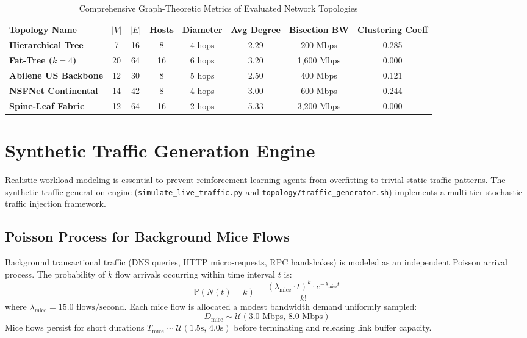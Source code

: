 \documentclass[12pt,a4paper,oneside]{report}
\begin{document}
\begin{table}[htbp]
\centering
\caption{Comprehensive Graph-Theoretic Metrics of Evaluated Network Topologies}
\label{tab:graph_metrics_comparative}
\small
\begin{tabularx}{\textwidth}{l c c c c c c c}
\toprule
\textbf{Topology Name} & \textbf{$|V|$} & \textbf{$|E|$} & \textbf{Hosts} & \textbf{Diameter} & \textbf{Avg Degree} & \textbf{Bisection BW} & \textbf{Clustering Coeff} \\
\midrule
\textbf{Hierarchical Tree} & 7 & 16 & 8 & 4 hops & 2.29 & 200 Mbps & 0.285 \\
\textbf{Fat-Tree ($k=4$)} & 20 & 64 & 16 & 6 hops & 3.20 & 1,600 Mbps & 0.000 \\
\textbf{Abilene US Backbone} & 12 & 30 & 8 & 5 hops & 2.50 & 400 Mbps & 0.121 \\
\textbf{NSFNet Continental} & 14 & 42 & 8 & 4 hops & 3.00 & 600 Mbps & 0.244 \\
\textbf{Spine-Leaf Fabric} & 12 & 64 & 16 & 2 hops & 5.33 & 3,200 Mbps & 0.000 \\
\bottomrule
\end{tabularx}
\end{table}

\section{Synthetic Traffic Generation Engine}
Realistic workload modeling is essential to prevent reinforcement learning agents from overfitting to trivial static traffic patterns. The synthetic traffic generation engine (\texttt{simulate\_live\_traffic.py} and \texttt{topology/traffic\_generator.sh}) implements a multi-tier stochastic traffic injection framework.

\subsection{Poisson Process for Background Mice Flows}
Background transactional traffic (DNS queries, HTTP micro-requests, RPC handshakes) is modeled as an independent Poisson arrival process. The probability of $k$ flow arrivals occurring within time interval $t$ is:
\begin{equation}
    \mathbb{P}(N(t) = k) = \frac{(\lambda_{\text{mice}} \cdot t)^k \cdot e^{-\lambda_{\text{mice}} t}}{k!}
\end{equation}
where $\lambda_{\text{mice}} = 15.0\text{ flows/second}$. Each mice flow is allocated a modest bandwidth demand uniformly sampled:
\begin{equation}
    D_{\text{mice}} \sim \mathcal{U}(3.0\text{ Mbps}, \, 8.0\text{ Mbps})
\end{equation}
Mice flows persist for short durations $T_{\text{mice}} \sim \mathcal{U}(1.5\text{s}, \, 4.0\text{s})$ before terminating and releasing link buffer capacity.
\end{document}
